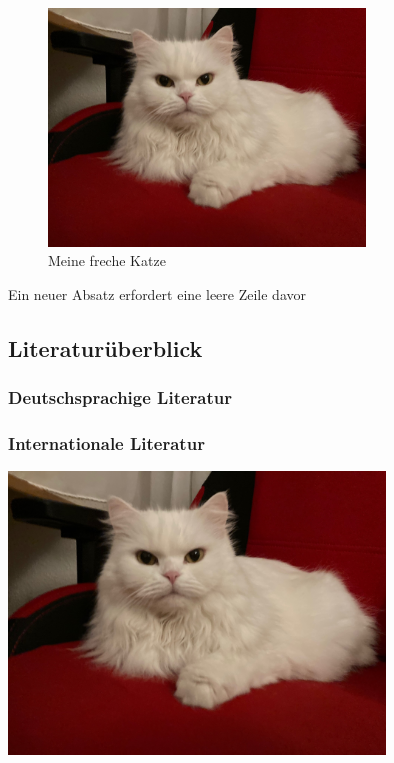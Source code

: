 \documentclass[12pt,parskip=half]{scrartcl}
\begin{document}
\begin{figure}
\centering
\includegraphics[width=0.75\textwidth]{Bilder/Katze}
\caption{Meine freche Katze}\label{fig:katze}
\end{figure}


Ein neuer Absatz erfordert eine leere Zeile davor

\blindtext[5]

\subsection{Literaturüberblick}
\subsubsection{Deutschsprachige Literatur}

\blindtext[5]

\subsubsection{Internationale Literatur}

\blindtext[5]

\begin{center}
\includegraphics[width=0.75\textwidth]{Bilder/Katze}
\label{fig:katze423}
\end{center}
\end{document}
